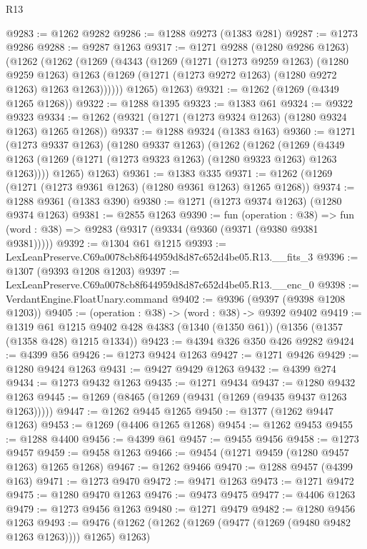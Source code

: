\begin{lexlean}{R13}
\begin{coremodule}
@9283 := @1262 @9282
@9286 := @1288 @9273 (@1383 @281)
@9287 := @1273 @9286
@9288 := @9287 @1263
@9317 := @1271
    @9288
    (@1280 @9286 @1263)
    (@1262
      (@1262
        (@1269
          (@4343
            (@1269
              (@1271
                (@1273 @9259 @1263)
                (@1280 @9259 @1263)
                @1263
                (@1269 (@1271 (@1273 @9272 @1263) (@1280 @9272 @1263) @1263 @1263))))))
        @1265)
      @1263)
@9321 := @1262 (@1269 (@4349 @1265 @1268))
@9322 := @1288 @1395
@9323 := @1383 @61
@9324 := @9322 @9323
@9334 := @1262 (@9321 (@1271 (@1273 @9324 @1263) (@1280 @9324 @1263) @1265 @1268))
@9337 := @1288 @9324 (@1383 @163)
@9360 := @1271
    (@1273 @9337 @1263)
    (@1280 @9337 @1263)
    (@1262
      (@1262
        (@1269 (@4349 @1263 (@1269 (@1271 (@1273 @9323 @1263) (@1280 @9323 @1263) @1263 @1263))))
        @1265)
      @1263)
@9361 := @1383 @335
@9371 := @1262 (@1269 (@1271 (@1273 @9361 @1263) (@1280 @9361 @1263) @1265 @1268))
@9374 := @1288 @9361 (@1383 @390)
@9380 := @1271 (@1273 @9374 @1263) (@1280 @9374 @1263)
@9381 := @2855 @1263
@9390 := fun (operation : @38) =>
  fun (word : @38) => @9283 (@9317 (@9334 (@9360 (@9371 (@9380 @9381 @9381)))))
@9392 := @1304 @61 @1215
@9393 := LexLeanPreserve.C69a0078cb8f644959d8d87c652d4be05.R13.__fits_3
@9396 := @1307 (@9393 @1208 @1203)
@9397 := LexLeanPreserve.C69a0078cb8f644959d8d87c652d4be05.R13.__enc_0
@9398 := VerdantEngine.FloatUnary.command
@9402 := @9396 (@9397 (@9398 @1208 @1203))
@9405 := (operation : @38) -> (word : @38) -> @9392 @9402
@9419 := @1319
    @61
    @1215
    @9402
    @428
    @4383
    (@1340 (@1350 @61))
    (@1356 (@1357 (@1358 @428) @1215 @1334))
@9423 := @4394 @326 @350 @426 @9282
@9424 := @4399 @56
@9426 := @1273 @9424 @1263
@9427 := @1271 @9426
@9429 := @1280 @9424 @1263
@9431 := @9427 @9429 @1263
@9432 := @4399 @274
@9434 := @1273 @9432 @1263
@9435 := @1271 @9434
@9437 := @1280 @9432 @1263
@9445 := @1269 (@8465 (@1269 (@9431 (@1269 (@9435 @9437 @1263 @1263)))))
@9447 := @1262 @9445 @1265
@9450 := @1377 (@1262 @9447 @1263)
@9453 := @1269 (@4406 @1265 @1268)
@9454 := @1262 @9453
@9455 := @1288 @4400
@9456 := @4399 @61
@9457 := @9455 @9456
@9458 := @1273 @9457
@9459 := @9458 @1263
@9466 := @9454 (@1271 @9459 (@1280 @9457 @1263) @1265 @1268)
@9467 := @1262 @9466
@9470 := @1288 @9457 (@4399 @163)
@9471 := @1273 @9470
@9472 := @9471 @1263
@9473 := @1271 @9472
@9475 := @1280 @9470 @1263
@9476 := @9473 @9475
@9477 := @4406 @1263
@9479 := @1273 @9456 @1263
@9480 := @1271 @9479
@9482 := @1280 @9456 @1263
@9493 := @9476 (@1262 (@1262 (@1269 (@9477 (@1269 (@9480 @9482 @1263 @1263)))) @1265) @1263)

\end{coremodule}
\end{lexlean}
